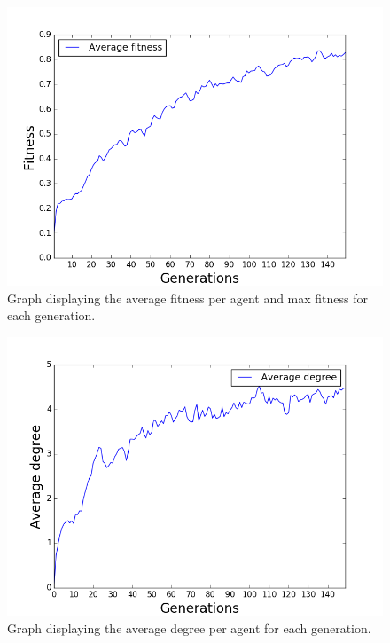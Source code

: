 \begin{figure}[htbp]
    \centering
    \includegraphics[scale=0.5]{fig/Results/Exp5/Fitness1}
    \caption{Graph displaying the average fitness per agent and max fitness for each generation.}
    \label{fig:Fitness5}
\end{figure}
\begin{figure}[htbp]
    \centering
    \includegraphics[scale=0.5]{fig/Results/Exp5/Degree1}
    \caption{Graph displaying the average degree per agent for each generation.}
    \label{fig:Degree5}
\end{figure}
